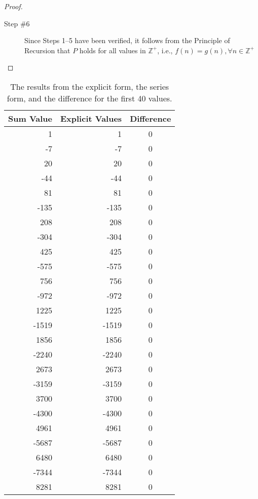 \documentclass[12pt]{scrartcl}
\begin{document}
\begin{proof}
\begin{description}
        \item[Step \#6]  Since Steps 1--5 have been verified, it follows from the Principle of Recursion that $P$ holds for all values in $\mathbb{Z^+}$, i.e., $f(n) = g(n), \forall n \in \mathbb{Z}^+$
    \end{description}
\end{proof}

\begin{table}[H]
    \centering
    \caption{The results from the explicit form, the series form, and the difference for the first \num{40} values.}
    \begin{tabular}{rrc}
        \toprule
        \textbf{Sum Value}    & \textbf{Explicit Values} & \textbf{Difference}  \\\midrule
            1      & 1      & 0 \\
            -7     & -7     & 0 \\
            20     & 20     & 0 \\
            -44    & -44    & 0 \\
            81     & 81     & 0 \\
            -135   & -135   & 0 \\
            208    & 208    & 0 \\
            -304   & -304   & 0 \\
            425    & 425    & 0 \\
            -575   & -575   & 0 \\
            756    & 756    & 0 \\
            -972   & -972   & 0 \\
            1225   & 1225   & 0 \\
            -1519  & -1519  & 0 \\
            1856   & 1856   & 0 \\
            -2240  & -2240  & 0 \\
            2673   & 2673   & 0 \\
            -3159  & -3159  & 0 \\
            3700   & 3700   & 0 \\
            -4300  & -4300  & 0 \\
            4961   & 4961   & 0 \\
            -5687  & -5687  & 0 \\
            6480   & 6480   & 0 \\
            -7344  & -7344  & 0 \\
            8281   & 8281   & 0 \\

\end{tabular}
\end{table}
\end{document}
